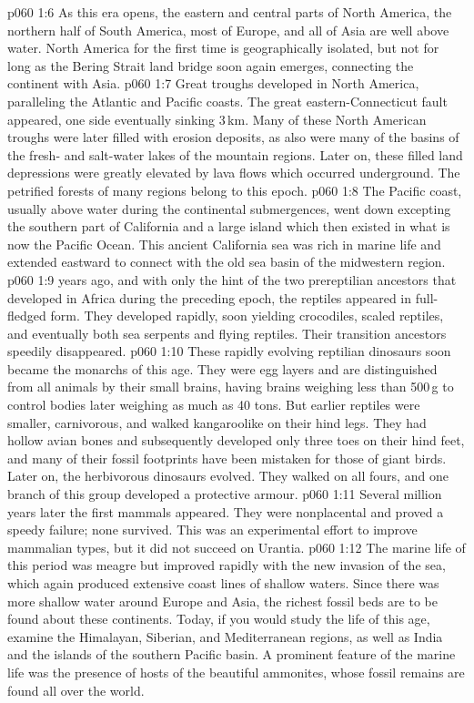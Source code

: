\vs p060 1:6 As this era opens, the eastern and central parts of North America, the northern half of South America, most of Europe, and all of Asia are well above water. North America for the first time is geographically isolated, but not for long as the Bering Strait land bridge soon again emerges, connecting the continent with Asia.
\vs p060 1:7 Great troughs developed in North America, paralleling the Atlantic and Pacific coasts. The great eastern\hyp{}Connecticut fault appeared, one side eventually sinking 3\,km. Many of these North American troughs were later filled with erosion deposits, as also were many of the basins of the fresh\hyp{} and salt\hyp{}water lakes of the mountain regions. Later on, these filled land depressions were greatly elevated by lava flows which occurred underground. The petrified forests of many regions belong to this epoch.
\vs p060 1:8 The Pacific coast, usually above water during the continental submergences, went down excepting the southern part of California and a large island which then existed in what is now the Pacific Ocean. This ancient California sea was rich in marine life and extended eastward to connect with the old sea basin of the midwestern region.
\vs p060 1:9 \pc {} years ago,  and with only the hint of the two prereptilian ancestors that developed in Africa during the preceding epoch, the reptiles appeared in full\hyp{}fledged form. They developed rapidly, soon yielding crocodiles, scaled reptiles, and eventually both sea serpents and flying reptiles. Their transition ancestors speedily disappeared.
\vs p060 1:10 These rapidly evolving reptilian dinosaurs soon became the monarchs of this age. They were egg layers and are distinguished from all animals by their small brains, having brains weighing less than 500\,g to control bodies later weighing as much as 40 tons. But earlier reptiles were smaller, carnivorous, and walked kangaroolike on their hind legs. They had hollow avian bones and subsequently developed only three toes on their hind feet, and many of their fossil footprints have been mistaken for those of giant birds. Later on, the herbivorous dinosaurs evolved. They walked on all fours, and one branch of this group developed a protective armour.
\vs p060 1:11 Several million years later the first mammals appeared. They were nonplacental and proved a speedy failure; none survived. This was an experimental effort to improve mammalian types, but it did not succeed on Urantia.
\vs p060 1:12 The marine life of this period was meagre but improved rapidly with the new invasion of the sea, which again produced extensive coast lines of shallow waters. Since there was more shallow water around Europe and Asia, the richest fossil beds are to be found about these continents. Today, if you would study the life of this age, examine the Himalayan, Siberian, and Mediterranean regions, as well as India and the islands of the southern Pacific basin. A prominent feature of the marine life was the presence of hosts of the beautiful ammonites, whose fossil remains are found all over the world.
